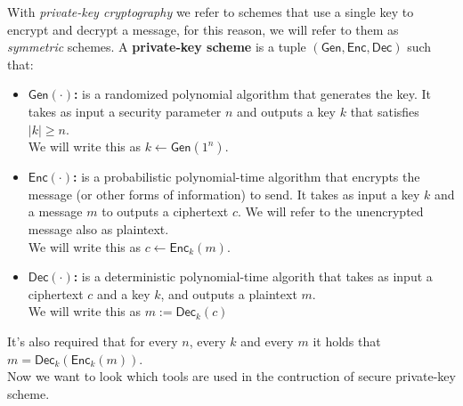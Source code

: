 With \emph{private-key cryptography} we refer to schemes that use a single key to encrypt and decrypt a message, for this reason, we will refer to them as \emph{symmetric} schemes.
A \textbf{private-key scheme} is a tuple $(\mathsf{Gen}, \mathsf{Enc}, \mathsf{Dec})$ such that:
\begin{itemize}
    \item{\textbf{$\mathsf{Gen}(\cdot)$:} is a randomized polynomial algorithm that generates the key. It takes as input a security parameter $n$ and outputs a key $k$ that satisfies $|k| \geq n$.\\
        We will write this as $k \leftarrow \mathsf{Gen}(1^n)$.}
    \item{\textbf{$\mathsf{Enc}(\cdot)$:} is a probabilistic polynomial-time algorithm that encrypts the message (or other forms of information) to send. It takes as input a key $k$ and a message $m$ to outputs a ciphertext $c$. We will refer to the unencrypted message also as plaintext.\\
        We will write this as $c \leftarrow \mathsf{Enc}_k(m)$.}
    \item{\textbf{$\mathsf{Dec}(\cdot)$:} is a deterministic polynomial-time algorith that takes as input a ciphertext $c$ and a key $k$, and outputs a plaintext $m$.\\
        We will write this as $m := \mathsf{Dec}_k(c)$}
\end{itemize}
It's also required that for every $n$, every $k$ and every $m$ it holds that $m = \mathsf{Dec}_k(\mathsf{Enc}_k(m))$.\\
Now we want to look which tools are used in the contruction of secure private-key scheme.

